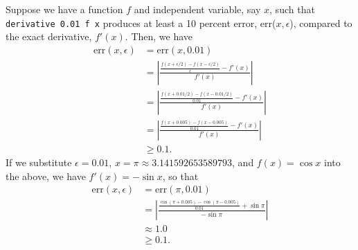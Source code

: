
Suppose we have a function $f$ and independent variable, say $x$, such that 
\verb|derivative 0.01 f x| produces at least a 10 percent error, err($x, \epsilon$), compared to 
the exact derivative, $f'(x)$. Then, we have
\begin{equation*}
    \begin{split}
        \text{err}(x, \epsilon) &= \text{err}(x, 0.01) \\ 
        &= \left| \frac{\frac{f(x + \epsilon/2) - f(x - \epsilon/2)}{\epsilon} - 
        f'(x)}{f'(x)} \right| \\
        &= \left| \frac{\frac{f(x + 0.01/2) - f(x - 0.01/2)}{0.01} - f'(x)}{f'(x)} \right| \\
        &= \left| \frac{\frac{f(x + 0.005) - f(x - 0.005)}{0.01} - f'(x)}{f'(x)} \right| \\
        &\geq 0.1.
    \end{split}
\end{equation*}
\qquad If we substitute $\epsilon = 0.01$, $x = \pi \approx 3.141592653589793$, and
$f(x) = \cos{x}$ into the above, we have $f'(x) = -\sin{x}$, so that
\begin{equation*}
    \begin{split}
        \text{err}(x, \epsilon) &= \text{err}(\pi, 0.01) \\ 
        &= \left| \frac{\frac{\cos{(\pi + 0.005)} - \cos{(\pi - 0.005)}}{0.01} 
        + \sin{\pi}}{-\sin{\pi}} \right| \\
        &\approx 1.0 \\
        &\geq 0.1.
    \end{split}
\end{equation*}
